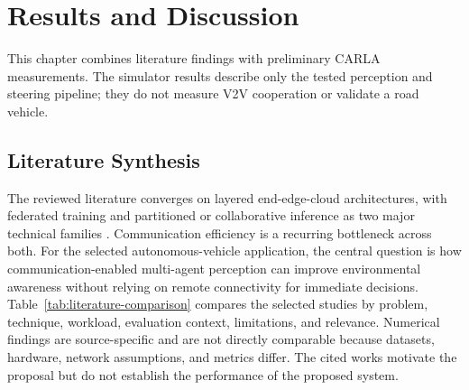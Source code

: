 \documentclass[12pt,a4paper,oneside]{report}
\begin{document}
\chapter{Results and Discussion}

\noindent
This chapter combines literature findings with preliminary CARLA
measurements. The simulator results describe only the tested perception and
steering pipeline; they do not measure V2V cooperation or validate a road
vehicle.

\section{Literature Synthesis}

The reviewed literature converges on layered end-edge-cloud architectures,
with federated training and partitioned or collaborative inference as two
major technical families \cite{deng2020,hou2022}. Communication efficiency
is a recurring bottleneck across both. For the selected autonomous-vehicle
application, the central question is how communication-enabled
multi-agent perception can improve environmental awareness without relying
on remote connectivity for immediate decisions. Table~\ref{tab:literature-comparison}
compares the selected studies by problem, technique, workload, evaluation
context, limitations, and relevance. Numerical findings are source-specific
and are not directly comparable because datasets, hardware, network
assumptions, and metrics differ. The cited works motivate the proposal but
do not establish the performance of the proposed system.
\end{document}
